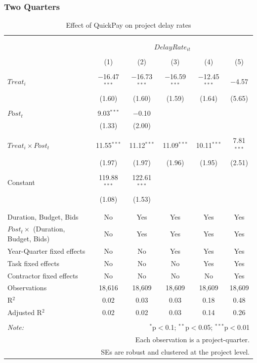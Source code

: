 \documentclass[
]{article}
\begin{document}
\hypertarget{two-quarters-3}{%
\subsubsection{Two Quarters}\label{two-quarters-3}}

\begin{table}[H] \centering 
  \caption{Effect of QuickPay on project delay rates} 
  \label{} 
\small 
\begin{tabular}{@{\extracolsep{-2pt}}lccccc} 
\\[-1.8ex]\hline 
\hline \\[-1.8ex] 
\\[-1.8ex] & \multicolumn{5}{c}{$DelayRate_{it}$} \\ 
\\[-1.8ex] & (1) & (2) & (3) & (4) & (5)\\ 
\hline \\[-1.8ex] 
 $Treat_i$ & $-$16.47$^{***}$ & $-$16.73$^{***}$ & $-$16.59$^{***}$ & $-$12.45$^{***}$ & $-$4.57 \\ 
  & (1.60) & (1.60) & (1.59) & (1.64) & (5.65) \\ 
  & & & & & \\ 
 $Post_t$ & 9.03$^{***}$ & $-$0.10 &  &  &  \\ 
  & (1.33) & (2.00) &  &  &  \\ 
  & & & & & \\ 
 $Treat_i \times Post_t$ & 11.55$^{***}$ & 11.12$^{***}$ & 11.09$^{***}$ & 10.11$^{***}$ & 7.81$^{***}$ \\ 
  & (1.97) & (1.97) & (1.96) & (1.95) & (2.51) \\ 
  & & & & & \\ 
 Constant & 119.88$^{***}$ & 122.61$^{***}$ &  &  &  \\ 
  & (1.08) & (1.53) &  &  &  \\ 
  & & & & & \\ 
\hline \\[-1.8ex] 
Duration, Budget, Bids & No & Yes & Yes & Yes & Yes \\ 
$Post_t \times$  (Duration, Budget, Bids) & No & Yes & Yes & Yes & Yes \\ 
Year-Quarter fixed effects & No & No & Yes & Yes & Yes \\ 
Task fixed effects & No & No & No & Yes & Yes \\ 
Contractor fixed effects & No & No & No & No & Yes \\ 
Observations & 18,616 & 18,609 & 18,609 & 18,609 & 18,609 \\ 
R$^{2}$ & 0.02 & 0.03 & 0.03 & 0.18 & 0.48 \\ 
Adjusted R$^{2}$ & 0.02 & 0.02 & 0.03 & 0.14 & 0.26 \\ 
\hline 
\hline \\[-1.8ex] 
\textit{Note:}  & \multicolumn{5}{r}{$^{*}$p$<$0.1; $^{**}$p$<$0.05; $^{***}$p$<$0.01} \\ 
 & \multicolumn{5}{r}{Each observation is a project-quarter.} \\ 
 & \multicolumn{5}{r}{SEs are robust and clustered at the project level.} \\ 
\end{tabular} 
\end{table}
\end{document}

